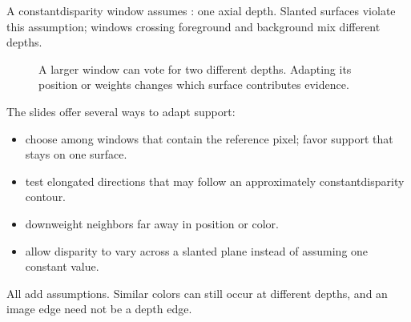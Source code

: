 \documentclass[letterpaper,11pt,english,openany,oneside]{jupyterBook}
\begin{document}
\sphinxAtStartPar
A constant\sphinxhyphen{}disparity window assumes : one axial depth. Slanted surfaces violate this assumption; windows crossing foreground and background mix different depths.

\begin{figure}[H]
\centering
\capstart

\noindent{}
\caption{A larger window can vote for two different depths. Adapting its position or weights changes which surface contributes evidence.}\label{\detokenize{lectures/lecture04/matching:fig-lec04-support}}\end{figure}

\sphinxAtStartPar
The slides offer several ways to adapt support:
\begin{itemize}
\item {}
\sphinxAtStartPar
{} choose among windows that contain the reference pixel; favor support that stays on one surface.

\item {}
\sphinxAtStartPar
{} test elongated directions that may follow an approximately constant\sphinxhyphen{}disparity contour.

\item {}
\sphinxAtStartPar
{} downweight neighbors far away in position or color.

\item {}
\sphinxAtStartPar
{} allow disparity to vary across a slanted plane instead of assuming one constant value.

\end{itemize}

\sphinxAtStartPar
All add assumptions. Similar colors can still occur at different depths, and an image edge need not be a depth edge.
\end{document}
